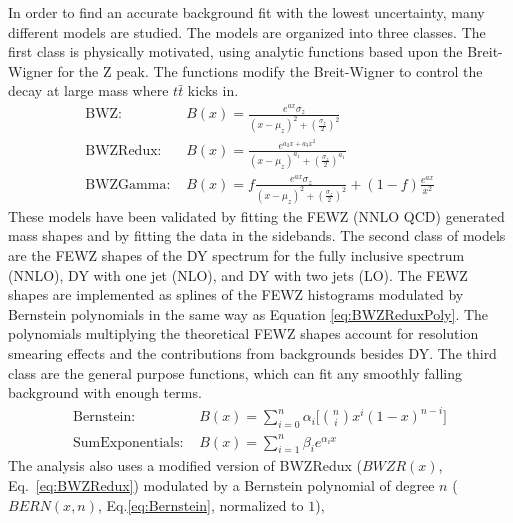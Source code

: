 In order to find an accurate background fit with the lowest uncertainty, many different models are studied. The models are organized into three classes. The first class is physically motivated, using analytic functions based upon the Breit-Wigner for the Z peak. The functions modify the Breit-Wigner to control the decay at large mass where $t\bar{t}$ kicks in. 
\begin{align}
        \label{eq:BWZ}
        \text{BWZ: }& {B(x)} = {\frac{e^{ax}\sigma_{z}}{(x-\mu_{z})^2 + (\frac{\sigma_{z}}{2})^2}} \\
        \label{eq:BWZRedux}
        \text{BWZRedux: }& {B(x)} = {\frac{e^{a_{2}x + a_{3}x^2}}{(x-\mu_{z})^{a_{1}} + (\frac{\sigma_{z}}{2})^{a_{1}}}} \\
        \label{eq:BWZGamma}
        \text{BWZGamma: }& {B(x)} = {f\frac{e^{ax}\sigma_{z}}{(x-\mu_{z})^2 + (\frac{\sigma_{z}}{2})^2} + (1-f)\frac{e^{ax}}{x^2}}
\end{align}
These models have been validated by fitting the FEWZ (NNLO QCD) generated mass shapes and by fitting the data in the sidebands. The second class of models are the FEWZ shapes of the DY spectrum for the fully inclusive spectrum (NNLO), DY with one jet (NLO), and DY with two jets (LO). The FEWZ shapes are implemented as splines of the FEWZ histograms modulated by Bernstein polynomials in the same way as Equation \ref{eq:BWZReduxPoly}. The polynomials multiplying the theoretical FEWZ shapes account for resolution smearing effects and the contributions from backgrounds besides DY. The third class are the general purpose functions, which can fit any smoothly falling background with enough terms.
\begin{align}
        \label{eq:Bernstein}
        \text{Bernstein: }& {B(x)} = {\sum_{i=0}^{n} \alpha_i[\binom{n}{i}x^{i}(1-x)^{n-i}}] \\
        \label{eq:SumExponentials}
        \text{SumExponentials: }& {B(x)} = {\sum_{i=1}^{n} \beta_{i}e^{\alpha_{i}x}}
\end{align}
The analysis also uses a modified version of BWZRedux ($BWZR(x)$, Eq.~\ref{eq:BWZRedux}) modulated by a Bernstein polynomial of degree $n$ ($BERN(x,n)$, Eq.\ref{eq:Bernstein}, normalized to $1$),
